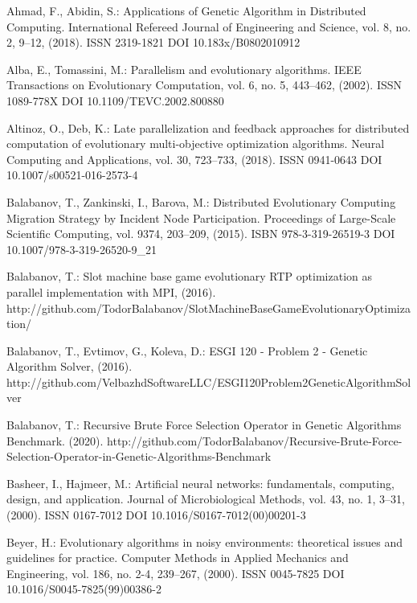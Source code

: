 
\begin{thebibliography}{99.}

 Ahmad, F., Abidin, S.: Applications of Genetic Algorithm in Distributed Computing. International Refereed Journal of Engineering and Science, vol. 8, no. 2, 9--12, (2018). ISSN 2319-1821 DOI 10.183x/B0802010912

 Alba, E., Tomassini, M.: Parallelism and evolutionary algorithms. IEEE Transactions on Evolutionary Computation, vol. 6, no. 5, 443--462, (2002). ISSN 1089-778X DOI 10.1109/TEVC.2002.800880

 Altinoz, O., Deb, K.: Late parallelization and feedback approaches for distributed computation of evolutionary multi-objective optimization algorithms. Neural Computing and Applications, vol. 30, 723--733, (2018). ISSN 0941-0643 DOI 10.1007/s00521-016-2573-4

 Balabanov, T., Zankinski, I., Barova, M.: Distributed Evolutionary Computing Migration Strategy by Incident Node Participation. Proceedings of Large-Scale Scientific Computing, vol. 9374, 203--209, (2015). ISBN 978-3-319-26519-3 DOI 10.1007/978-3-319-26520-9\_21

 Balabanov, T.: Slot machine base game evolutionary RTP optimization as parallel implementation with MPI, (2016). http://github.com/TodorBalabanov/SlotMachineBaseGameEvolutionaryOptimization/

 Balabanov, T., Evtimov, G., Koleva, D.: ESGI 120 - Problem 2 - Genetic Algorithm Solver, (2016). http://github.com/VelbazhdSoftwareLLC/ESGI120Problem2GeneticAlgorithmSolver

 Balabanov, T.: Recursive Brute Force Selection Operator in Genetic Algorithms Benchmark. (2020). http://github.com/TodorBalabanov/Recursive-Brute-Force-Selection-Operator-in-Genetic-Algorithms-Benchmark

 Basheer, I., Hajmeer, M.: Artificial neural networks: fundamentals, computing, design, and application. Journal of Microbiological Methods, vol. 43, no. 1, 3--31, (2000). ISSN 0167-7012 DOI 10.1016/S0167-7012(00)00201-3

 Beyer, H.: Evolutionary algorithms in noisy environments: theoretical issues and guidelines for practice. Computer Methods in Applied Mechanics and Engineering, vol. 186, no. 2-4, 239--267, (2000). ISSN 0045-7825 DOI 10.1016/S0045-7825(99)00386-2


\end{thebibliography}
